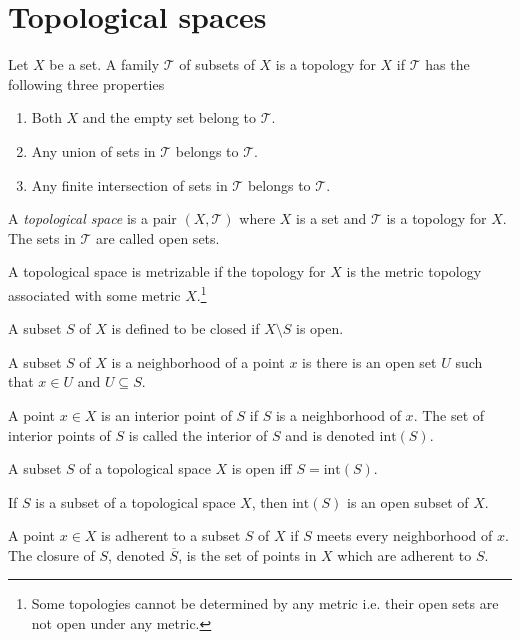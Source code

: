 \documentclass[nobib,notoc]{tufte-handout}
\begin{document}
\section{Topological spaces}
\begin{defi}[Topology]
	Let \(X\) be a set. A family \(\mathscr{T}\) of subsets of \(X\) is a topology for \(X\) if \(\mathscr{T}\) has the following three properties
	\begin{enumerate}
		\item Both \(X\) and the empty set belong to \(\mathscr{T}\).
		\item Any union of sets in \(\mathscr{T}\) belongs to \(\mathscr{T}\).
		\item Any finite intersection of sets in \(\mathscr{T}\) belongs to \(\mathscr{T}\).
	\end{enumerate}
	A \emph{topological space} is a pair \((X,\mathscr{T})\) where \(X\) is a set and \(\mathscr{T}\) is a topology for \(X\). The sets in \(\mathscr{T}\) are called open sets.
\end{defi}
\begin{defi}[Metrizable]
	A topological space is metrizable if the topology for \(X\) is the metric topology associated with some metric \(X\).\footnote{Some topologies cannot be determined by any metric i.e. their open sets are not open under any metric.}
\end{defi}
\begin{defi}
	A subset \(S\) of \(X\) is defined to be closed if \(X\setminus S\) is open.
\end{defi}
\begin{defi}[Neighborhood]
	A subset \(S\) of \(X\) is a neighborhood of a point \(x\) is there is an open set \(U\) such that \(x\in U\) and \(U\subseteq S\).
\end{defi}
\begin{defi}
	A point \(x\in X\) is an interior point of \(S\) if \(S\) is a neighborhood of \(x\). The set of interior points of \(S\) is called the interior of \(S\) and is denoted \(\text{int}(S)\).
\end{defi}
\begin{thm}
	A subset \(S\) of a topological space \(X\) is open iff \(S=\text{int}(S)\).
\end{thm}
\begin{thm}
	If \(S\) is a subset of a topological space \(X\), then \(\text{int}(S)\) is an open subset of \(X\).
\end{thm}
\begin{defi}
	A point \(x\in X\) is adherent to a subset \(S\) of \(X\) if \(S\) meets every neighborhood of \(x\). The closure of \(S\), denoted \(\overline{S}\), is the set of points in \(X\) which are adherent to \(S\).
\end{defi}
\end{document}
